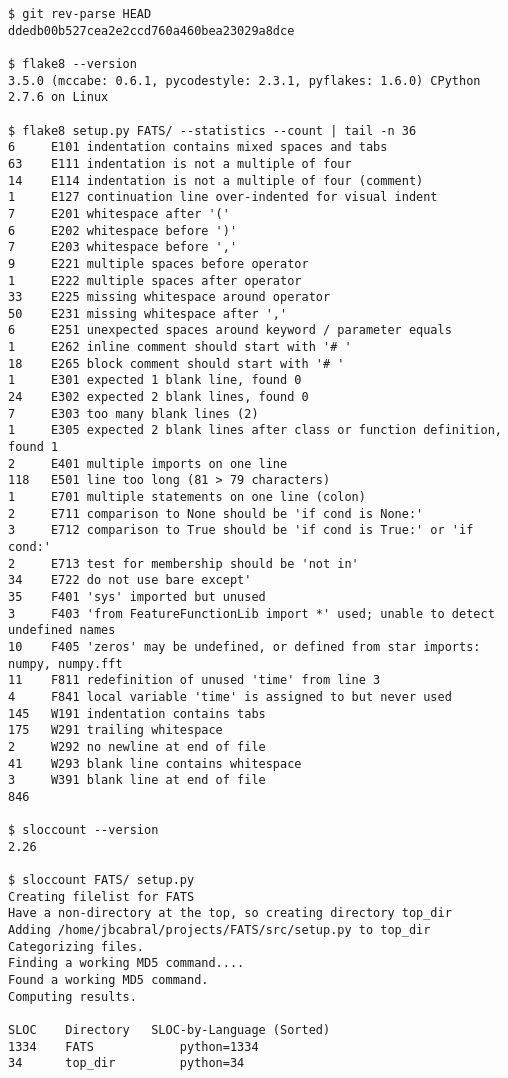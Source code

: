 \begin{verbatim}
$ git rev-parse HEAD
ddedb00b527cea2e2ccd760a460bea23029a8dce

$ flake8 --version
3.5.0 (mccabe: 0.6.1, pycodestyle: 2.3.1, pyflakes: 1.6.0) CPython 2.7.6 on Linux

$ flake8 setup.py FATS/ --statistics --count | tail -n 36
6     E101 indentation contains mixed spaces and tabs
63    E111 indentation is not a multiple of four
14    E114 indentation is not a multiple of four (comment)
1     E127 continuation line over-indented for visual indent
7     E201 whitespace after '('
6     E202 whitespace before ')'
7     E203 whitespace before ','
9     E221 multiple spaces before operator
1     E222 multiple spaces after operator
33    E225 missing whitespace around operator
50    E231 missing whitespace after ','
6     E251 unexpected spaces around keyword / parameter equals
1     E262 inline comment should start with '# '
18    E265 block comment should start with '# '
1     E301 expected 1 blank line, found 0
24    E302 expected 2 blank lines, found 0
7     E303 too many blank lines (2)
1     E305 expected 2 blank lines after class or function definition, found 1
2     E401 multiple imports on one line
118   E501 line too long (81 > 79 characters)
1     E701 multiple statements on one line (colon)
2     E711 comparison to None should be 'if cond is None:'
3     E712 comparison to True should be 'if cond is True:' or 'if cond:'
2     E713 test for membership should be 'not in'
34    E722 do not use bare except'
35    F401 'sys' imported but unused
3     F403 'from FeatureFunctionLib import *' used; unable to detect undefined names
10    F405 'zeros' may be undefined, or defined from star imports: numpy, numpy.fft
11    F811 redefinition of unused 'time' from line 3
4     F841 local variable 'time' is assigned to but never used
145   W191 indentation contains tabs
175   W291 trailing whitespace
2     W292 no newline at end of file
41    W293 blank line contains whitespace
3     W391 blank line at end of file
846

$ sloccount --version
2.26

$ sloccount FATS/ setup.py 
Creating filelist for FATS
Have a non-directory at the top, so creating directory top_dir
Adding /home/jbcabral/projects/FATS/src/setup.py to top_dir
Categorizing files.
Finding a working MD5 command....
Found a working MD5 command.
Computing results.

SLOC	Directory	SLOC-by-Language (Sorted)
1334    FATS            python=1334
34      top_dir         python=34


\end{verbatim}
